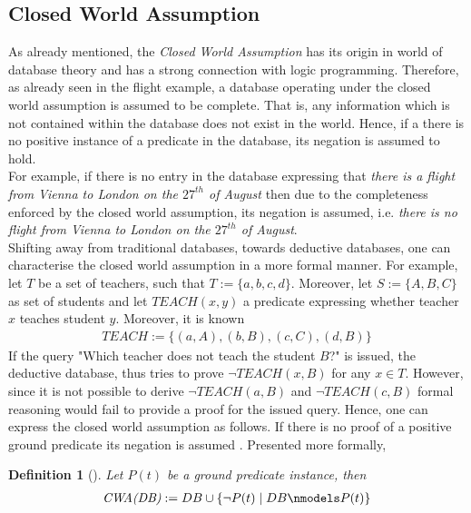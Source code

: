 \documentclass{article}
\newtheorem{mydef}[thm]{Definition}
\begin{document}
\subsection{Closed World Assumption}
As already mentioned, the \emph{Closed World Assumption} has its origin in world of database theory and has a strong connection with logic programming. Therefore, as already seen in the flight example, a database operating under the closed world assumption is assumed to be complete. That is, any information which is not contained within the database does not exist in the world.
Hence, if a there is no positive instance of a predicate in the database, its negation is assumed to hold.\\ For example, if there is no entry in the database expressing that \textit{there is a flight from Vienna to London on the $27^{th}$ of August} then due to the completeness enforced by the closed world assumption, its negation is assumed, i.e. \textit{there is no flight from Vienna to London on the $27^{th}$ of August}. \cite{nonmonoton_stanford2018, brewka1997nonmonotonic} \\
Shifting away from traditional databases, towards deductive databases, one can characterise the closed world assumption in a more formal manner. For example, let $T$ be a set of teachers, such that $T:=\{a,b,c,d\}$. Moreover, let $S:=\{A,B,C\}$ as set of students and let $TEACH(x,y)$ a predicate expressing whether teacher $x$ teaches student $y$.  Moreover, it is known
\begin{equation*}
\begin{split}
TEACH := \{(a,A), (b,B), (c,C), (d,B)\}
\end{split}
\end{equation*}
If the query "Which teacher does not teach the student $B$?" is issued, the deductive database, thus tries to prove $\neg TEACH(x,B)$ for any $x \in T$. However, since it is not possible to derive  $\neg TEACH(a,B)$  and $\neg TEACH(c,B)$ formal reasoning would fail to provide a proof for the issued query. Hence, one can express the closed world assumption as follows. If there is no proof of a positive ground predicate its negation is assumed \cite{reiter1981closed}. Presented more formally,

\begin{mydef}[\cite{brewka1997nonmonotonic}]
Let $P(t)$ be a ground predicate instance, then
\begin{equation*}
\begin{split}
\textit{CWA(DB)}:= DB \cup \{\neg P(t) \mid DB \nmodels P(t)\}
\end{split}
\end{equation*}
\end{mydef} 
\end{document}
